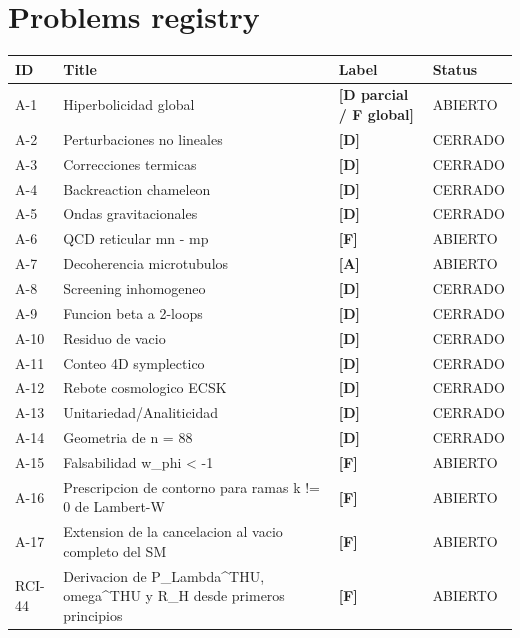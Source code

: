﻿\documentclass[11pt,letterpaper]{article}
\begin{document}
\section*{Problems registry}

\begin{longtable}{@{}p{1.2cm}p{6.5cm}p{1.8cm}p{2cm}@{}}
\toprule
\textbf{ID} & \textbf{Title} & \textbf{Label} & \textbf{Status} \\
\midrule
\endhead
A-1 & Hiperbolicidad global & \textcolor{Dgreen}{\textbf{[D parcial / F global]}} & ABIERTO \\
A-2 & Perturbaciones no lineales & \textcolor{Dgreen}{\textbf{[D]}} & CERRADO \\
A-3 & Correcciones termicas & \textcolor{Dgreen}{\textbf{[D]}} & CERRADO \\
A-4 & Backreaction chameleon & \textcolor{Dgreen}{\textbf{[D]}} & CERRADO \\
A-5 & Ondas gravitacionales & \textcolor{Dgreen}{\textbf{[D]}} & CERRADO \\
A-6 & QCD reticular mn - mp & \textcolor{Forange}{\textbf{[F]}} & ABIERTO \\
A-7 & Decoherencia microtubulos & \textcolor{Ayellow}{\textbf{[A]}} & ABIERTO \\
A-8 & Screening inhomogeneo & \textcolor{Dgreen}{\textbf{[D]}} & CERRADO \\
A-9 & Funcion beta a 2-loops & \textcolor{Dgreen}{\textbf{[D]}} & CERRADO \\
A-10 & Residuo de vacio & \textcolor{Dgreen}{\textbf{[D]}} & CERRADO \\
A-11 & Conteo 4D symplectico & \textcolor{Dgreen}{\textbf{[D]}} & CERRADO \\
A-12 & Rebote cosmologico ECSK & \textcolor{Dgreen}{\textbf{[D]}} & CERRADO \\
A-13 & Unitariedad/Analiticidad & \textcolor{Dgreen}{\textbf{[D]}} & CERRADO \\
A-14 & Geometria de n = 88 & \textcolor{Dgreen}{\textbf{[D]}} & CERRADO \\
A-15 & Falsabilidad w\_phi < -1 & \textcolor{Forange}{\textbf{[F]}} & ABIERTO \\
A-16 & Prescripcion de contorno para ramas k != 0 de Lambert-W & \textcolor{Forange}{\textbf{[F]}} & ABIERTO \\
A-17 & Extension de la cancelacion al vacio completo del SM & \textcolor{Forange}{\textbf{[F]}} & ABIERTO \\
RCI-44 & Derivacion de P\_Lambda\textasciicircum{}THU, omega\textasciicircum{}THU y R\_H desde primeros principios & \textcolor{Forange}{\textbf{[F]}} & ABIERTO \\
\bottomrule
\end{longtable}
\end{document}
